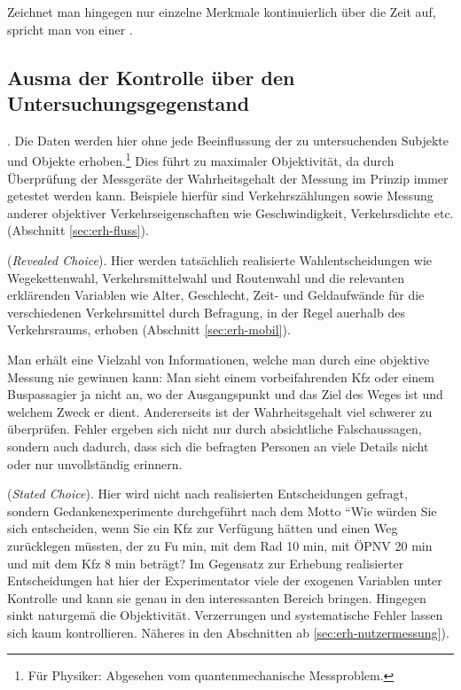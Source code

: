 \item Zeichnet man hingegen nur einzelne Merkmale
kontinuierlich \"uber die Zeit auf, spricht man von einer .
\ei

\subsection{Ausma\3 der Kontrolle \"uber den Untersuchungsgegenstand}

\bi
\item {}. Die Daten werden hier
ohne jede Beeinflussung der zu untersuchenden Subjekte und Objekte
erhoben.\footnote{F\"ur Physiker: Abgesehen vom quantenmechanische
Messproblem.} 
Dies f\"uhrt zu maximaler Objektivit\"at, da durch
\"Uberpr\"ufung der Messger\"ate der
Wahrheitsgehalt der Messung im Prinzip immer getestet werden kann. 
Beispiele hierf\"ur sind Verkehrsz\"ahlungen
sowie Messung anderer objektiver Verkehrseigenschaften wie
Geschwindigkeit, Ver\-kehrsdichte etc.
(Abschnitt
\ref{sec:erh-fluss}). 

\item {} (\emph{Revealed Choice}). Hier werden tat\-s\"ach\-lich realisierte Wahlentscheidungen wie
Wegekettenwahl, Verkehrs\-mittel\-wahl und Routenwahl und die relevanten
erkl\"arenden Variablen wie Alter, Ge\-schlecht, Zeit- und
Geldaufw\"ande f\"ur die verschiedenen Verkehrsmittel durch Befragung,
in der Regel au\3erhalb des Verkehrsraums, erhoben (Abschnitt
\ref{sec:erh-mobil}).  

Man erh\"alt eine
Vielzahl von Informationen, welche man durch eine objektive Messung
nie gewinnen kann: Man sieht einem vorbeifahrenden Kfz oder einem
Buspassagier  ja nicht an, wo der Ausgangspunkt und das Ziel des Weges
ist und welchem Zweck er dient. Andererseits ist der Wahrheitsgehalt
viel schwerer zu \"uberpr\"ufen. Fehler ergeben sich nicht nur durch
absichtliche Falschaussagen, sondern auch dadurch, dass sich die
befragten Personen  an
viele Details nicht oder nur unvollst\"andig erinnern.

\item {}
(\emph{Stated Choice}). Hier wird
nicht nach realisierten Entscheidungen gefragt, sondern
Gedankenexperimente durch\-gef\"uhrt nach dem Motto ``Wie w\"urden Sie
sich entscheiden, wenn Sie ein Kfz zur Verf\"ugung h\"atten und einen
Weg zur\"ucklegen m\"ussten, der zu Fu min, mit dem Rad 10 min,
mit \"OPNV 20 min
und mit dem Kfz 8 min betr\"agt?  Im Gegensatz zur Erhebung
realisierter Entscheidungen hat hier der Experimentator viele der
exogenen Variablen unter Kontrolle und kann sie genau in den
interessanten Bereich bringen. Hingegen sinkt naturgem\"a\3 die
Objektivit\"at. Verzerrungen und systematische Fehler lassen sich kaum
kontrollieren. N\"aheres in den Abschnitten ab
\ref{sec:erh-nutzermessung}).

